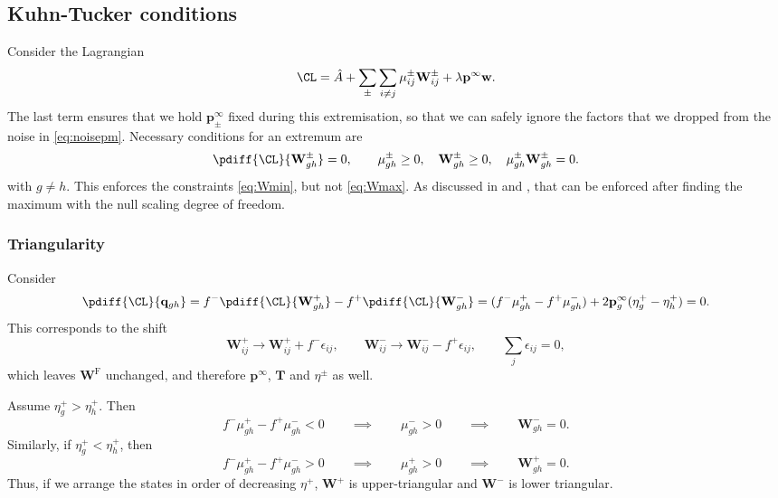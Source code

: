 \documentclass[12pt]{article}
\newcommand{\eq}{\mathbf{p}^\infty}
\newcommand{\fpt}{\mathbf{T}}
\newcommand{\w}{\mathbf{w}}
\newcommand{\W}{\mathbf{W}}
\newcommand{\enc}{\mathbf{q}}
\newcommand{\frg}{\W^{\mathrm{F}}}
\begin{document}
\subsection{Kuhn-Tucker conditions}\label{sec:kuhntucker}

Consider the Lagrangian
%
\begin{equation}\label{eq:lagrangian}
  \CL = \hat{A} + \sum_{\pm}\sum_{i\neq j} \mu^\pm_{ij} \W^\pm_{ij} +\lambda\eq\w.
\end{equation}
%
The last term ensures that we hold $\eq_\pm$ fixed during this extremisation, so that we can safely ignore the factors that we dropped from the noise in \eqref{eq:noisepm}.
Necessary conditions for an extremum are
%
\begin{equation}\label{eq:extremum}
  \pdiff{\CL}{\W^\pm_{gh}} = 0,
  \qquad
    \mu^\pm_{gh} \geq 0,\quad
    \W^\pm_{gh} \geq 0,\quad
    \mu^\pm_{gh}\W^\pm_{gh} = 0.
\end{equation}
%
with $g \neq h$. This enforces the constraints \eqref{eq:Wmin}, but not \eqref{eq:Wmax}. As discussed in  and , that can be enforced after finding the maximum with the null scaling degree of freedom.

\subsubsection{Triangularity}\label{sec:triangular}

Consider
%
\begin{equation}\label{eq:shiftqderiv}
  \pdiff{\CL}{\enc_{gh}} =
  f^- \pdiff{\CL}{\W^+_{gh}} - f^+ \pdiff{\CL}{\W^-_{gh}}
   = (f^- \mu^+_{gh} - f^+ \mu^-_{gh}) + 2\eq_g (\eta^+_g - \eta^+_h)
   = 0.
\end{equation}
%
This corresponds to the shift
%
\begin{equation}\label{eq:shiftq}
  \W^+_{ij} \to \W^+_{ij} + f^-\epsilon_{ij},
  \qquad
  \W^-_{ij} \to \W^-_{ij} - f^+\epsilon_{ij},
  \qquad
  \sum_j \epsilon_{ij} = 0,
\end{equation}
%
which leaves $\frg$ unchanged, and therefore $\eq$, $\fpt$ and $\eta^\pm$ as well.

Assume $\eta^+_g > \eta^+_h$. Then
%
\begin{equation}\label{eq:lowertriangular}
 f^- \mu^+_{gh} - f^+ \mu^-_{gh} <0
 \qquad\implies\qquad
 \mu^-_{gh} >0
 \qquad\implies\qquad
 \W^-_{gh}=0.
\end{equation}
%
Similarly, if $\eta^+_g < \eta^+_h$, then
%
\begin{equation}\label{eq:uppertriangular}
 f^- \mu^+_{gh} - f^+ \mu^-_{gh} > 0
 \qquad\implies\qquad
 \mu^+_{gh} >0
 \qquad\implies\qquad
 \W^+_{gh}=0.
\end{equation}
%
Thus, if we arrange the states in order of decreasing $\eta^+$, $\W^+$ is upper-triangular and $\W^-$ is lower triangular.
\end{document}
